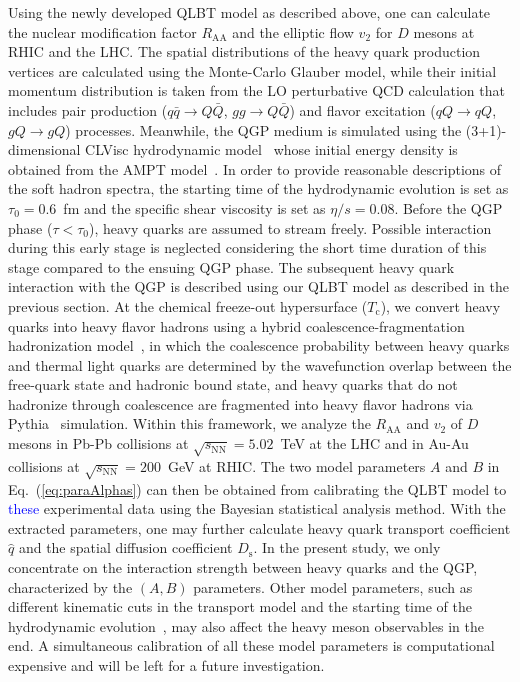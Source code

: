 \documentclass[aps,superscriptaddress,prc,twocolumn,nofootinbib]{revtex4}
\begin{document}
Using the newly developed QLBT model as described above, one can calculate the nuclear modification factor $R_\mathrm{AA}$ and the elliptic flow $v_2$ for $D$ mesons at RHIC and the LHC. The spatial distributions of the heavy quark production vertices are calculated using the Monte-Carlo Glauber model, while their initial momentum distribution is taken from the LO perturbative QCD calculation that includes pair production ($q\bar{q}\rightarrow Q\bar{Q}$, $gg\rightarrow Q\bar{Q}$) and flavor excitation ($qQ\rightarrow qQ$, $gQ\rightarrow gQ$) processes. Meanwhile, the QGP medium is simulated using the (3+1)-dimensional CLVisc hydrodynamic model~\cite {Pang:2018zzo,Wu:2018cpc} whose initial energy density is obtained from the AMPT model~\cite{Lin:2004en}. In order to provide reasonable descriptions of the soft hadron spectra, the starting time of the hydrodynamic evolution is set as $\tau_0=0.6$~fm and the specific shear viscosity is set as $\eta/s=0.08$. 
Before the QGP phase ($\tau < \tau_0$), heavy quarks are assumed to stream freely. Possible interaction during this early stage \cite{Mrowczynski:2017kso, Carrington:2020sww} is neglected considering the short time duration of this stage compared to the ensuing QGP phase. The subsequent heavy quark interaction with the QGP is described using our QLBT model as described in the previous section. At the chemical freeze-out hypersurface ($T_\mathrm{c}$), we convert heavy quarks into heavy flavor hadrons using a hybrid coalescence-fragmentation hadronization model~\cite{Cao:2019iqs}, in which the coalescence probability between heavy quarks and thermal light quarks are determined by the wavefunction overlap between the free-quark state and hadronic bound state, and heavy quarks that do not hadronize through coalescence are fragmented into heavy flavor hadrons via Pythia~\cite{Sjostrand:2006za} simulation. Within this framework, we analyze the $R_\mathrm{AA}$ and $v_2$ of $D$ mesons in Pb-Pb collisions at $\sqrt{s_\mathrm{NN}} = 5.02$~TeV at the LHC and in Au-Au collisions at $\sqrt{s_\mathrm{NN}}= 200$~GeV at RHIC. The two model parameters $A$ and $B$ in Eq.~(\ref{eq:paraAlphas}) can then be obtained from calibrating the QLBT model to \textcolor{blue}{these} experimental data using the Bayesian statistical analysis method.
With the extracted parameters, one may further calculate heavy quark transport coefficient $\hat{q}$ and the spatial diffusion coefficient $D_\mathrm{s}$. {\color{blue} In the present study, we only concentrate on the interaction strength between heavy quarks and the QGP, characterized by the $(A, B)$ parameters. Other model parameters, such as different kinematic cuts in the transport model and the starting time of the hydrodynamic evolution~\cite{Andres:2019eus}, may also affect the heavy meson observables in the end. A simultaneous calibration of all these model parameters is computational expensive and will be left for a future investigation.}
\end{document}
